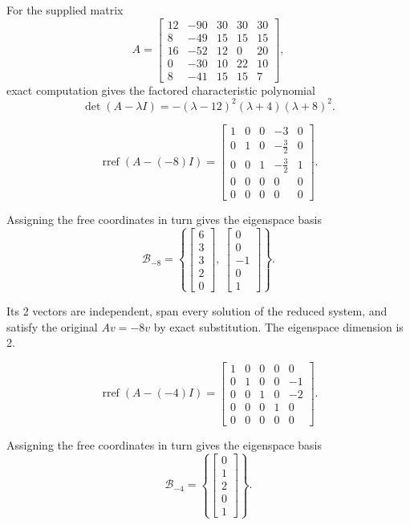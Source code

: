 For the supplied matrix
\[ A=\begin{bmatrix}12 & -90 & 30 & 30 & 30\\8 & -49 & 15 & 15 & 15\\16 & -52 & 12 & 0 & 20\\0 & -30 & 10 & 22 & 10\\8 & -41 & 15 & 15 & 7\end{bmatrix},\]
exact computation gives the factored characteristic polynomial
\[ \det(A-\lambda I)=- \left(\lambda - 12\right)^{2} \left(\lambda + 4\right) \left(\lambda + 8\right)^{2}.\]

\[ \operatorname{rref}(A-(-8)I)=\begin{bmatrix}1 & 0 & 0 & -3 & 0\\0 & 1 & 0 & - \frac{3}{2} & 0\\0 & 0 & 1 & - \frac{3}{2} & 1\\0 & 0 & 0 & 0 & 0\\0 & 0 & 0 & 0 & 0\end{bmatrix}.\]

Assigning the free coordinates in turn gives the eigenspace basis
\[ \mathcal B_{-8}=\left\{\begin{bmatrix}6\\3\\3\\2\\0\end{bmatrix},\ \begin{bmatrix}0\\0\\-1\\0\\1\end{bmatrix}\right\}.\]

Its 2 vectors are independent, span every solution of the reduced system, and satisfy the original $Av=-8v$ by exact substitution. The eigenspace dimension is 2.

\[ \operatorname{rref}(A-(-4)I)=\begin{bmatrix}1 & 0 & 0 & 0 & 0\\0 & 1 & 0 & 0 & -1\\0 & 0 & 1 & 0 & -2\\0 & 0 & 0 & 1 & 0\\0 & 0 & 0 & 0 & 0\end{bmatrix}.\]

Assigning the free coordinates in turn gives the eigenspace basis
\[ \mathcal B_{-4}=\left\{\begin{bmatrix}0\\1\\2\\0\\1\end{bmatrix}\right\}.\]

